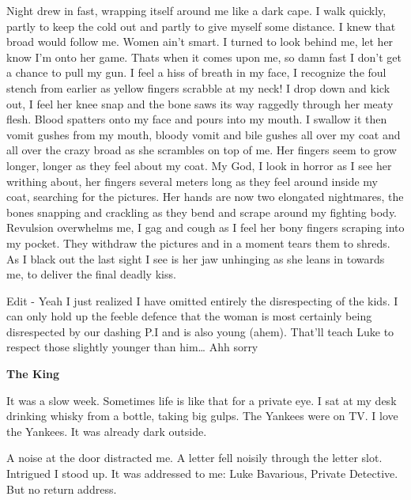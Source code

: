 Night drew in fast, wrapping itself around me like a dark cape. I
walk quickly, partly to keep the cold out and partly to give myself
some distance. I knew that broad would follow me. Women ain't
smart. I turned to look behind me, let her know I'm onto her game.
Thats when it comes upon me, so damn fast I don't get a chance to
pull my gun. I feel a hiss of breath in my face, I recognize the
foul stench from earlier as yellow fingers scrabble at my neck! I
drop down and kick out, I feel her knee snap and the bone saws its
way raggedly through her meaty flesh. Blood spatters onto my face
and pours into my mouth. I swallow it then vomit gushes from my
mouth, bloody vomit and bile gushes all over my coat and all over
the crazy broad as she scrambles on top of me. Her fingers seem to
grow longer, longer as they feel about my coat. My God, I look in
horror as I see her writhing about, her fingers several meters long
as they feel around inside my coat, searching for the pictures. Her
hands are now two elongated nightmares, the bones snapping and
crackling as they bend and scrape around my fighting body.
Revulsion overwhelms me, I gag and cough as I feel her bony fingers
scraping into my pocket. They withdraw the pictures and in a moment
tears them to shreds. As I black out the last sight I see is her
jaw unhinging as she leans in towards me, to deliver the final
deadly kiss.





Edit - Yeah I just realized I have omitted entirely the
disrespecting of the kids. I can only hold up the feeble defence
that the woman is most certainly being disrespected by our dashing
P.I and is also young (ahem). That'll teach Luke to respect those
slightly younger than him{\ldots} Ahh sorry  
 





{\bf The King}



It was a slow week. Sometimes life is like that for a private eye.
I sat at my desk drinking whisky from a bottle, taking big gulps.
The Yankees were on TV. I love the Yankees. It was already dark
outside.



A noise at the door distracted me. A letter fell noisily through
the letter slot. Intrigued I stood up. It was addressed to me: Luke
Bavarious, Private Detective. But no return address.



